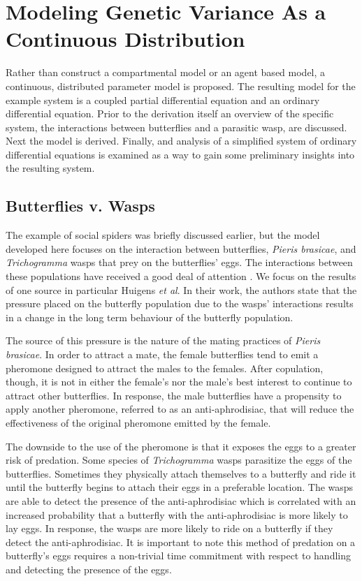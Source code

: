 \documentclass[review]{elsarticle}
\begin{document}
\section{Modeling Genetic Variance As a Continuous Distribution}

Rather than construct a compartmental model or an agent based model, a
continuous, distributed parameter model is proposed. The resulting
model for the example system is a coupled partial differential
equation and an ordinary differential equation. Prior to the
derivation itself an overview of the specific system, the interactions
between butterflies and a parasitic wasp, are discussed. Next the
model is derived. Finally, and analysis of a simplified system of
ordinary differential equations is examined as a way to gain some
preliminary insights into the resulting system.

\subsection{Butterflies v. Wasps}
\label{butterflyVWasps}

The example of social spiders was briefly discussed earlier, but the
model developed here focuses on the interaction between butterflies,
\textit{Pieris brasicae}, and \textit{Trichogramma} wasps that prey on
the butterflies' eggs. The interactions between these populations have
received a good deal of attention
\cite{PMC2797620,doi:10.1111/j.1439-0418.1986.tb00834.x,Figueroa2010AttractionOT,10.3389/fpls.2019.01768}. We
focus on the results of one source in particular Huigens \textit{et
  al}\cite{10.1093/beheco/arq007}. In their work, the authors state
that the pressure placed on the butterfly population due to the wasps'
interactions results in a change in the long term behaviour of the
butterfly population.

The source of this pressure is the nature of the mating practices of
\textit{Pieris brasicae}. In order to attract a mate, the female
butterflies tend to emit a pheromone designed to attract the males to
the females. After copulation, though, it is not in either the
female's nor the male's best interest to continue to attract other
butterflies. In response, the male butterflies have a propensity to
apply another pheromone, referred to as an anti-aphrodisiac, that will
reduce the effectiveness of the original pheromone emitted by the
female.

The downside to the use of the pheromone is that it exposes the eggs
to a greater risk of predation. Some species of \textit{Trichogramma}
wasps parasitize the eggs of the butterflies. Sometimes they
physically attach themselves to a butterfly and ride it until the
butterfly begins to attach their eggs in a preferable location. The
wasps are able to detect the presence of the anti-aphrodisiac which is
correlated with an increased probability that a butterfly with the
anti-aphrodisiac is more likely to lay eggs. In response, the wasps
are more likely to ride on a butterfly if they detect the
anti-aphrodisiac. It is important to note this method of predation on
a butterfly's eggs requires a non-trivial time commitment with respect
to handling and detecting the presence of the eggs.
\end{document}
